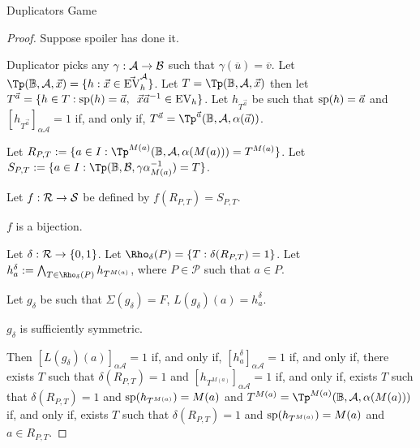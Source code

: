 \documentclass[../main/thesis.tex]{subfiles}
\begin{document}
\begin{lem}
  Duplicators Game
\end{lem}
\begin{proof}
  Suppose spoiler has done it.

  Duplicator picks any $\gamma : \mathcal{A} \rightarrow \mathcal{B}$ such that
  $\gamma(\overline{u}) = \overline{v}$. Let $\Tp (\BB, \mathcal{A}, \vec{x}) =
  \{h : \vec{x} \in \vec{\EV}^{\mathcal{A}}_h\}$. Let $T = \Tp (\BB,
  \mathcal{A}, \vec{x})$ then let $T^{\vec{a}} = \{h \in T : \text{sp}(h) =
  \vec{a}, \,\,\, \vec{x}\vec{a}^{-1} \in \text{EV}_h \}$. Let $h_{T^{\vec{a}}}$ be
  such that $\text{sp}(h) = \vec{a}$ and $[h_{T^{\vec{a}}}]_{\alpha \mathcal{A}} =
  1$ if, and only if, $T^{\vec{a}} = \Tp^{\vec{a}}(\BB, \mathcal{A},
  \alpha(\vec{a}))$.

  Let $R_{P, T} := \{a \in I : \Tp^{M(a)}(\BB, \mathcal{A}, \alpha (M(a))) =
  T^{M(a)}\}$. Let $S_{P, T} := \{a \in I : \Tp(\BB, \mathcal{B}, \gamma
  \alpha^{-1}_{M(a)}) = T\}$.

  Let $f : \mathcal{R} \rightarrow \mathcal{S}$ be defined by $f(R_{P, T}) = S_{P, T}$.

  \begin{claim}
    $f$ is a bijection.
  \end{claim}



  Let $\delta : \mathcal{R} \rightarrow \{0,1\}$. Let $\Rho_\delta(P) = \{T :
  \delta(R_{P, T}) = 1\}$. Let $h^\delta_a := \bigwedge_{T \in \Rho_\delta(P)}
  h_{T^{M(a)}}$, where $P \in \mathcal{P}$ such that $a \in P$.

  Let $g_\delta$ be such that $\Sigma (g_\delta) = F$, $L(g_{\delta})(a) =
  h^{\delta}_a$.
  
  \begin{claim}
    $g_{\delta}$ is sufficiently symmetric.
  \end{claim}

  Then $[L(g_{\delta})(a)]_{\alpha \mathcal{A}} = 1$ if, and only if,
  $[h^{\delta}_a]_{\alpha \mathcal{A}} = 1$ if, and only if, there exists $T$
  such that $\delta (R_{P, T}) = 1$ and $[h_{T^{M(a)}}]_{\alpha \mathcal{A}} =
  1$ if, and only if, exists $T$ such that $\delta(R_{P, T}) = 1$ and
  $\text{sp}(h_{T^{M(a)}}) = M(a)$ and $T^{M(a)} = \Tp^{M(a)}(\BB, \mathcal{A},
  \alpha(M(a)))$ if, and only if, exists $T$ such that $\delta(R_{P, T}) = 1$
  and $\text{sp}(h_{T^{M(a)}}) = M(a)$ and $a \in R_{P, T}$.


\end{proof}
\end{document}
